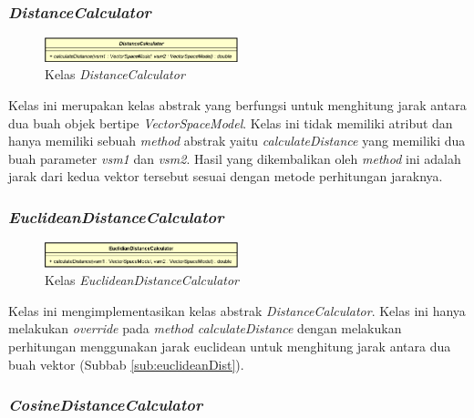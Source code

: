 \documentclass[a4paper,twoside]{article}
\begin{document}
\begin{enumerate}
\subsubsection*{\textit{DistanceCalculator}}

\begin{figure}[h]
	\begin{center}
		\includegraphics[width=0.5\textwidth]{DiagramKelas/DistanceCalculator}
		\caption{Kelas \textit{DistanceCalculator}}
		\label{fig:kelasDistanceCalculator}
	\end{center}
\end{figure}

Kelas ini merupakan kelas abstrak yang berfungsi untuk menghitung jarak antara dua buah objek bertipe \textit{VectorSpaceModel}. Kelas ini tidak memiliki atribut dan hanya memiliki sebuah \textit{method} abstrak yaitu \textit{calculateDistance} yang memiliki dua buah parameter \textit{vsm1} dan \textit{vsm2}. Hasil yang dikembalikan oleh \textit{method} ini adalah jarak dari kedua vektor tersebut sesuai dengan metode perhitungan jaraknya.

\subsubsection*{\textit{EuclideanDistanceCalculator}}

\begin{figure}[h]
	\begin{center}
		\includegraphics[width=0.5\textwidth]{DiagramKelas/EuclideanDistanceCalculator}
		\caption{Kelas \textit{EuclideanDistanceCalculator}}
		\label{fig:kelasEuclideanDist}
	\end{center}
\end{figure}

Kelas ini mengimplementasikan kelas abstrak \textit{DistanceCalculator}. Kelas ini hanya melakukan \textit{override} pada \textit{method calculateDistance} dengan melakukan perhitungan menggunakan jarak euclidean untuk menghitung jarak antara dua buah vektor (Subbab \ref{sub:euclideanDist}).

\subsubsection*{\textit{CosineDistanceCalculator}}


\end{enumerate}
\end{document}
